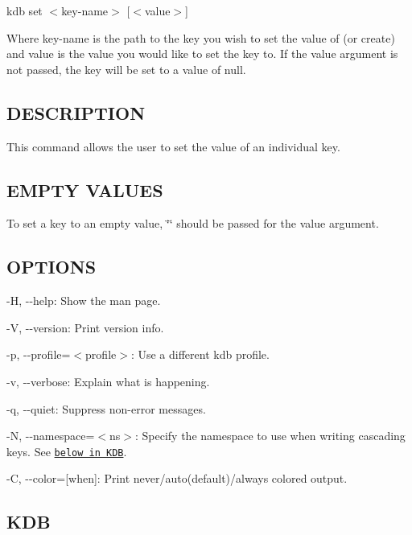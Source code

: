 {\ttfamily kdb set $<$key-\/name$>$ \mbox{[}$<$value$>$\mbox{]}}

Where {\ttfamily key-\/name} is the path to the key you wish to set the value of (or create) and {\ttfamily value} is the value you would like to set the key to. If the {\ttfamily value} argument is not passed, the key will be set to a value of {\ttfamily null}.

\subsection*{D\+E\+S\+C\+R\+I\+P\+T\+I\+O\+N}

This command allows the user to set the value of an individual key.

\subsection*{E\+M\+P\+T\+Y V\+A\+L\+U\+E\+S}

To set a key to an empty value, {\ttfamily \char`\"{}\char`\"{}} should be passed for the {\ttfamily value} argument.

\subsection*{O\+P\+T\+I\+O\+N\+S}


\begin{DoxyItemize}
\item {\ttfamily -\/\+H}, {\ttfamily -\/-\/help}\+: Show the man page.
\item {\ttfamily -\/\+V}, {\ttfamily -\/-\/version}\+: Print version info.
\item {\ttfamily -\/p}, {\ttfamily -\/-\/profile}=$<$profile$>$\+: Use a different kdb profile.
\item {\ttfamily -\/v}, {\ttfamily -\/-\/verbose}\+: Explain what is happening.
\item {\ttfamily -\/q}, {\ttfamily -\/-\/quiet}\+: Suppress non-\/error messages.
\item {\ttfamily -\/\+N}, {\ttfamily -\/-\/namespace}=$<$ns$>$\+: Specify the namespace to use when writing cascading keys. See \href{#KDB}{\tt below in K\+D\+B}.
\item {\ttfamily -\/\+C}, {\ttfamily -\/-\/color}=\mbox{[}when\mbox{]}\+: Print never/auto(default)/always colored output.
\end{DoxyItemize}

\subsection*{K\+D\+B}


